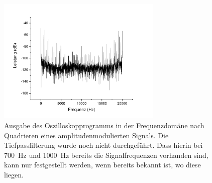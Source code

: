 \documentclass[
a4paper,
12pt,
pagesize,
ngerman
]{scrartcl}
\begin{document}

	\begin{figure}[H]  
		\includegraphics[width=0.7\textwidth]{Origin-Files/AM-Demod-Quadrat-preTP}
		\centering
		\caption{Ausgabe des Oszilloskopprogramms in der Frequenzdomäne nach Quadrieren eines amplitudenmodulierten Signals. Die Tiefpassfilterung wurde noch nicht durchgeführt.
		Dass hierin bei \SI{700}{\hertz} und \SI{1000}{\hertz} bereits die Signalfrequenzen vorhanden sind, kann nur festgestellt werden, wenn bereits bekannt ist, wo diese liegen.
		}
		\label{fig_tag3_am_demod_quadrat_preTP}
		\centering
	\end{figure}
\end{document}
